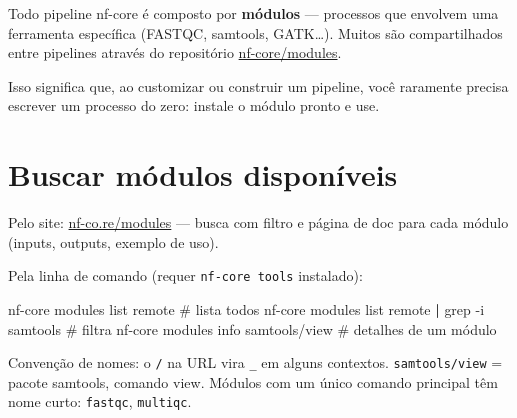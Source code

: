 \documentclass[
  brazilian,
  letterpaper,
  DIV=11,
  numbers=noendperiod]{scrreprt}
\newenvironment{Shaded}{\begin{snugshade}}{\end{snugshade}}
\newcommand{\AttributeTok}[1]{\textcolor[rgb]{0.40,0.45,0.13}{#1}}
\newcommand{\CommentTok}[1]{\textcolor[rgb]{0.37,0.37,0.37}{#1}}
\newcommand{\ExtensionTok}[1]{\textcolor[rgb]{0.00,0.23,0.31}{#1}}
\newcommand{\FunctionTok}[1]{\textcolor[rgb]{0.28,0.35,0.67}{#1}}
\newcommand{\KeywordTok}[1]{\textcolor[rgb]{0.00,0.23,0.31}{\textbf{#1}}}
\newcommand{\NormalTok}[1]{\textcolor[rgb]{0.00,0.23,0.31}{#1}}
\begin{document}
Todo pipeline nf-core é composto por \textbf{módulos} --- processos que
envolvem uma ferramenta específica (FASTQC, samtools, GATK\ldots).
Muitos são compartilhados entre pipelines através do repositório
\href{https://nf-co.re/modules}{nf-core/modules}.

Isso significa que, ao customizar ou construir um pipeline, você
raramente precisa escrever um processo do zero: instale o módulo pronto
e use.

\section{Buscar módulos
disponíveis}\label{buscar-muxf3dulos-disponuxedveis}

Pelo site: \href{https://nf-co.re/modules}{nf-co.re/modules} --- busca
com filtro e página de doc para cada módulo (inputs, outputs, exemplo de
uso).

Pela linha de comando (requer \texttt{nf-core\ tools} instalado):

\begin{Shaded}
\begin{Highlighting}[]
\ExtensionTok{nf{-}core}\NormalTok{ modules list remote                        }\CommentTok{\# lista todos}
\ExtensionTok{nf{-}core}\NormalTok{ modules list remote }\KeywordTok{|} \FunctionTok{grep} \AttributeTok{{-}i}\NormalTok{ samtools     }\CommentTok{\# filtra}
\ExtensionTok{nf{-}core}\NormalTok{ modules info samtools/view                 }\CommentTok{\# detalhes de um módulo}
\end{Highlighting}
\end{Shaded}

\begin{tcolorbox}[enhanced jigsaw, arc=.35mm, bottomrule=.15mm, bottomtitle=1mm, breakable, colback=white, colbacktitle=quarto-callout-note-color!10!white, colframe=quarto-callout-note-color-frame, coltitle=black, left=2mm, leftrule=.75mm, opacityback=0, opacitybacktitle=0.6, rightrule=.15mm, title=\textcolor{quarto-callout-note-color}{\faInfo}\hspace{0.5em}{Nota}, titlerule=0mm, toprule=.15mm, toptitle=1mm]

Convenção de nomes: o \texttt{/} na URL vira \texttt{\_} em alguns
contextos. \texttt{samtools/view} = pacote samtools, comando view.
Módulos com um único comando principal têm nome curto: \texttt{fastqc},
\texttt{multiqc}.

\end{tcolorbox}
\end{document}
